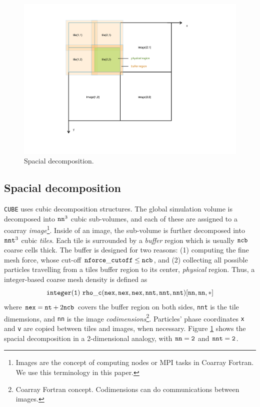\documentclass[10pt,twocolumn,preprint]{emulateapj}
\begin{document}
\begin{figure}[t]
\includegraphics[width=1.0\linewidth]{fig_tile.pdf}
\caption{Spacial decomposition.}
\label{fig.tile}
\end{figure}

\subsection{Spacial decomposition}
{\tt CUBE} uses cubic decomposition structures. The global simulation volume is decomposed into ${\tt nn}^3$ cubic sub-volumes, and each of these are assigned to a coarray {\it image}\footnote{Images are the concept of computing nodes or MPI tasks in Coarray Fortran. We use this terminology in this paper.}. Inside of an image, the sub-volume is further decomposed into ${\tt nnt}^3$ cubic {\it tiles}. Each tile is surrounded by a {\it buffer} region which is usually ${\tt ncb}$ coarse cells thick. The buffer is designed for two reasons: (1) computing the fine mesh force, whose cut-off ${\tt nforce\_cutoff}\leq{\tt ncb}$, and (2) collecting all possible particles travelling from a tiles buffer region to its center, {\it physical} region. Thus, a integer-based coarse mesh density is defined as
\begin{equation*}
{\tt integer(1)\ rho\_c(nex,nex,nex,nnt,nnt,nnt)[nn,nn,*]}\\
\end{equation*}
where ${\tt nex}={\tt nt}+2{\tt ncb}$ covers the buffer region on both sides, {\tt nnt} is the tile dimemsions, and {\tt nn} is the image {\it codimensions}\footnote{Coarray Fortran concept. Codimensions can do communications between images.}. Particles' phase coordinates {\tt x} and {\tt v} are copied between tiles and images, when necessary. Figure \ref{fig.tile} shows the spacial decomposition in a 2-dimensional analogy, with ${\tt nn=2}$ and ${\tt nnt=2}$.
\end{document}

